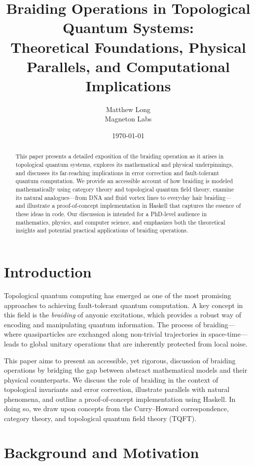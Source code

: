 \documentclass[12pt]{article}
\title{\bf Braiding Operations in Topological Quantum Systems: \\ Theoretical Foundations, Physical Parallels, and Computational Implications}
\author{Matthew Long \\
Magneton Labs}
\date{\today}
\begin{document}
\maketitle

\begin{abstract}
This paper presents a detailed exposition of the braiding operation as it arises in topological quantum systems, explores its mathematical and physical underpinnings, and discusses its far-reaching implications in error correction and fault-tolerant quantum computation. We provide an accessible account of how braiding is modeled mathematically using category theory and topological quantum field theory, examine its natural analogues---from DNA and fluid vortex lines to everyday hair braiding---and illustrate a proof-of-concept implementation in Haskell that captures the essence of these ideas in code. Our discussion is intended for a PhD-level audience in mathematics, physics, and computer science, and emphasizes both the theoretical insights and potential practical applications of braiding operations.
\end{abstract}

\tableofcontents

\newpage

\section{Introduction}

Topological quantum computing has emerged as one of the most promising approaches to achieving fault-tolerant quantum computation. A key concept in this field is the \emph{braiding} of anyonic excitations, which provides a robust way of encoding and manipulating quantum information. The process of braiding---where quasiparticles are exchanged along non-trivial trajectories in space-time---leads to global unitary operations that are inherently protected from local noise. 

This paper aims to present an accessible, yet rigorous, discussion of braiding operations by bridging the gap between abstract mathematical models and their physical counterparts. We discuss the role of braiding in the context of topological invariants and error correction, illustrate parallels with natural phenomena, and outline a proof-of-concept implementation using Haskell. In doing so, we draw upon concepts from the Curry–Howard correspondence, category theory, and topological quantum field theory (TQFT).

\section{Background and Motivation}
\end{document}
